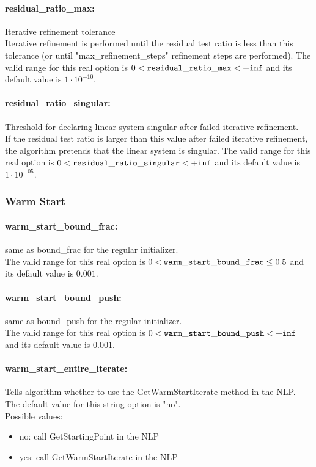 \paragraph{residual\_ratio\_max:}\label{sec:residual_ratio_max} Iterative refinement tolerance $\;$ \\
 Iterative refinement is performed until the
residual test ratio is less than this tolerance
(or until "max\_refine\-ment\_steps" refinement
steps are performed). The valid range for this real option is 
$0 <  {\tt residual\_ratio\_max } <  {\tt +inf}$
and its default value is $1 \cdot 10^{-10}$.


\paragraph{residual\_ratio\_singular:}\label{sec:residual_ratio_singular} Threshold for declaring linear system singular after failed iterative refinement. $\;$ \\
 If the residual test ratio is larger than this
value after failed iterative refinement, the
algorithm pretends that the linear system is
singular. The valid range for this real option is 
$0 <  {\tt residual\_ratio\_singular } <  {\tt +inf}$
and its default value is $1 \cdot 10^{-05}$.


\subsubsection{Warm Start}
\label{sec:Warm_Start}

\paragraph{warm\_start\_bound\_frac:}\label{sec:warm_start_bound_frac} same as bound\_frac for the regular initializer. $\;$ \\
 The valid range for this real option is 
$0 <  {\tt warm\_start\_bound\_frac } \le 0.5$
and its default value is $0.001$.


\paragraph{warm\_start\_bound\_push:}\label{sec:warm_start_bound_push} same as bound\_push for the regular initializer. $\;$ \\
 The valid range for this real option is 
$0 <  {\tt warm\_start\_bound\_push } <  {\tt +inf}$
and its default value is $0.001$.


\paragraph{warm\_start\_entire\_iterate:}\label{sec:warm_start_entire_iterate} Tells algorithm whether to use the GetWarmStartIterate method in the NLP. $\;$ \\
The default value for this string option is "no".
\\ 
Possible values:
\begin{itemize}
   \item no: call GetStartingPoint in the NLP
   \item yes: call GetWarmStartIterate in the NLP
\end{itemize}

